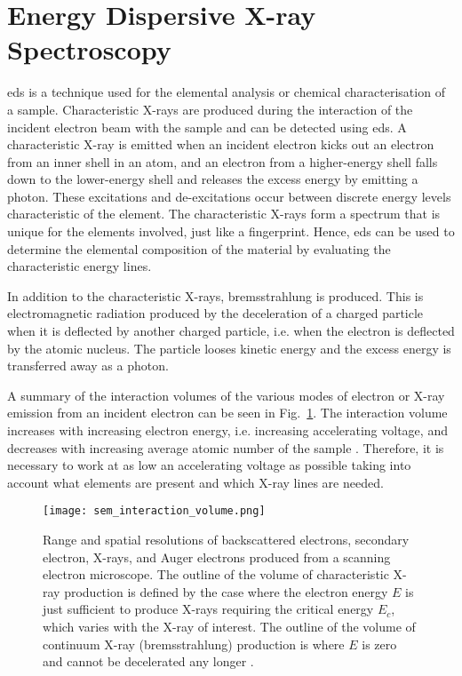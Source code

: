 \section{Energy Dispersive X-ray Spectroscopy}\label{sec:eds}
\Acf{eds} is a technique used for the elemental analysis or chemical characterisation of a sample. Characteristic X-rays are produced during the interaction of the incident electron beam with the sample and can be detected using \ac{eds}. A characteristic X-ray is emitted when an incident electron kicks out an electron from an inner shell in an atom, and an electron from a higher-energy shell falls down to the lower-energy shell and releases the excess energy by emitting a photon. These excitations and de-excitations occur between discrete energy levels characteristic of the element. The characteristic X-rays form a spectrum that is unique for the elements involved, just like a fingerprint. Hence, \ac{eds} can be used to determine the elemental composition of the material by evaluating the characteristic energy lines. 

In addition to the characteristic X-rays, bremsstrahlung is produced. This is electromagnetic radiation produced by the deceleration of a charged particle when it is deflected by another charged particle, i.e. when the electron is deflected by the atomic nucleus. The particle looses kinetic energy and the excess energy is transferred away as a photon.

A summary of the interaction volumes of the various modes of electron or X-ray emission from an incident electron can be seen in Fig.~\ref{fig:sem_interaction_volume}. The interaction volume increases with increasing electron energy, i.e. increasing accelerating voltage, and decreases with increasing average atomic number of the sample \citep{goldstein2012scanning}. Therefore, it is necessary to work at as low an accelerating voltage as possible taking into account what elements are present and which X-ray lines are needed.%

\begin{figure}[htbp]
    \centering
    \texttt{[image: sem\_interaction\_volume.png]}
    \caption[Range and spatial resolutions of backscattered electrons, secondary electron, X-rays, and Auger electrons produced from a SEM.]{Range and spatial resolutions of backscattered electrons, secondary electron, X-rays, and Auger electrons produced from a scanning electron microscope. The outline of the volume of characteristic X-ray production is defined by the case where the electron energy $E$ is just sufficient to produce X-rays requiring the critical energy $E_c$, which varies with the X-ray of interest. The outline of the volume of continuum X-ray (bremsstrahlung) production is where $E$ is zero and cannot be decelerated any longer \citep[Reprinted from][]{goldstein2012scanning}.}
    \label{fig:sem_interaction_volume}
\end{figure}

